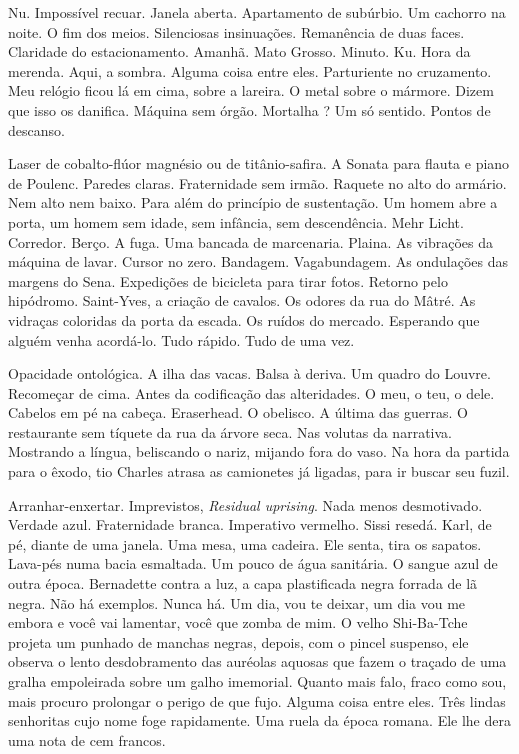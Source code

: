 Nu. Impossível recuar. Janela aberta. Apartamento de subúrbio. Um
cachorro na noite. O fim dos meios. Silenciosas insinuações. Remanência
de duas faces. Claridade do estacionamento. Amanhã. Mato Grosso. Minuto.
Ku. Hora da merenda. Aqui, a sombra. Alguma coisa entre eles.
Parturiente no cruzamento. Meu relógio ficou lá em cima, sobre a
lareira. O metal sobre o mármore. Dizem que isso os danifica. Máquina
sem órgão. Mortalha ? Um só sentido. Pontos de descanso.

Laser de cobalto-flúor magnésio ou de titânio-safira. A Sonata para
flauta e piano de Poulenc. Paredes claras. Fraternidade sem irmão.
Raquete no alto do armário. Nem alto nem baixo. Para além do princípio
de sustentação. Um homem abre a porta, um homem sem idade, sem infância,
sem descendência. Mehr Licht. Corredor. Berço. A fuga. Uma bancada de
marcenaria. Plaina. As vibrações da máquina de lavar. Cursor no zero.
Bandagem. Vagabundagem. As ondulações das margens do Sena. Expedições de
bicicleta para tirar fotos. Retorno pelo hipódromo. Saint-Yves, a
criação de cavalos. Os odores da rua do Mâtré. As vidraças coloridas da
porta da escada. Os ruídos do mercado. Esperando que alguém venha
acordá-lo. Tudo rápido. Tudo de uma vez.

Opacidade ontológica. A ilha das vacas. Balsa à deriva. Um quadro do
Louvre. Recomeçar de cima. Antes da codificação das alteridades. O meu,
o teu, o dele. Cabelos em pé na cabeça. Eraserhead. O obelisco. A última
das guerras. O restaurante sem tíquete da rua da árvore seca. Nas
volutas da narrativa. Mostrando a língua, beliscando o nariz, mijando
fora do vaso. Na hora da partida para o êxodo, tio Charles atrasa as
camionetes já ligadas, para ir buscar seu fuzil.

Arranhar-enxertar. Imprevistos, \emph{Residual uprising}. Nada menos
desmotivado. Verdade azul. Fraternidade branca. Imperativo vermelho.
Sissi resedá. Karl, de pé, diante de uma janela. Uma mesa, uma cadeira.
Ele senta, tira os sapatos. Lava-pés numa bacia esmaltada. Um pouco de
água sanitária. O sangue azul de outra época. Bernadette contra a luz, a
capa plastificada negra forrada de lã negra. Não há exemplos. Nunca há.
Um dia, vou te deixar, um dia vou me embora e você vai lamentar, você
que zomba de mim. O velho Shi-Ba-Tche projeta um punhado de manchas
negras, depois, com o pincel suspenso, ele observa o lento desdobramento
das auréolas aquosas que fazem o traçado de uma gralha empoleirada sobre
um galho imemorial. Quanto mais falo, fraco como sou, mais procuro
prolongar o perigo de que fujo. Alguma coisa entre eles. Três lindas
senhoritas cujo nome foge rapidamente. Uma ruela da época romana. Ele
lhe dera uma nota de cem francos.

